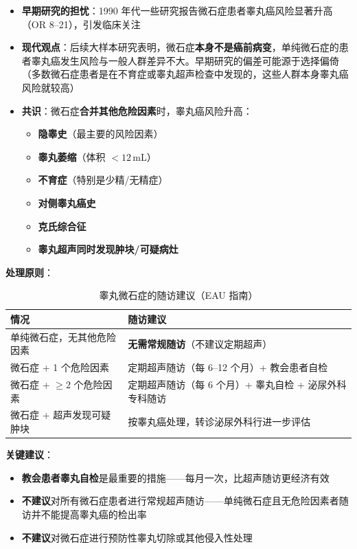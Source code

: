 \begin{enumerate}
\begin{itemize}[leftmargin=2cm]
	\item \textbf{早期研究的担忧}：1990 年代一些研究报告微石症患者睾丸癌风险显著升高（OR 8--21），引发临床关注
	\item \textbf{现代观点}：后续大样本研究表明，微石症\textbf{本身不是癌前病变}，单纯微石症的患者睾丸癌发生风险与一般人群差异不大。早期研究的偏差可能源于选择偏倚（多数微石症患者是在不育症或睾丸超声检查中发现的，这些人群本身睾丸癌风险就较高）
	\item \textbf{共识}：微石症\textbf{合并其他危险因素}时，睾丸癌风险升高：
	\begin{itemize}
		\item \textbf{隐睾史}（最主要的风险因素）
		\item \textbf{睾丸萎缩}（体积 $<12\,$mL）
		\item \textbf{不育症}（特别是少精/无精症）
		\item \textbf{对侧睾丸癌史}
		\item \textbf{克氏综合征}
		\item \textbf{睾丸超声同时发现肿块/可疑病灶}
	\end{itemize}
\end{itemize}

\vspace{0.5em}
\noindent\textbf{处理原则}：

\begin{table}[htbp]
\centering
\caption{睾丸微石症的随访建议（EAU 指南）}
\label{tab:microlithiasis_followup}
\begin{tabularx}{\textwidth}{@{}lX@{}}
    \toprule
    \textbf{情况} & \textbf{随访建议} \\
    \midrule
    单纯微石症，无其他危险因素 & \textbf{无需常规随访}（不建议定期超声） \\
    微石症 + 1 个危险因素 & 定期超声随访（每 6--12 个月）+ 教会患者自检 \\
    微石症 + $\geq 2$ 个危险因素 & 定期超声随访（每 6 个月）+ 睾丸自检 + 泌尿外科专科随访 \\
    微石症 + 超声发现可疑肿块 & 按睾丸癌处理，转诊泌尿外科行进一步评估 \\
    \bottomrule
\end{tabularx}
\end{table}

\vspace{0.5em}
\noindent\textbf{关键建议}：
\begin{itemize}[leftmargin=2cm]
	\item \textbf{教会患者睾丸自检}是最重要的措施——每月一次，比超声随访更经济有效
	\item \textbf{不建议}对所有微石症患者进行常规超声随访——单纯微石症且无危险因素者随访并不能提高睾丸癌的检出率
	\item \textbf{不建议}对微石症进行预防性睾丸切除或其他侵入性处理
\end{itemize}


\end{enumerate}
